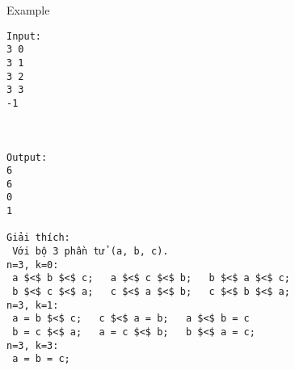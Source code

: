 Example
\begin{verbatim}
Input:
3 0
3 1
3 2
3 3
-1



Output:
6
6
0
1

Giải thích:
 Với bộ 3 phần tử (a, b, c). 
n=3, k=0:
 a $<$ b $<$ c;   a $<$ c $<$ b;   b $<$ a $<$ c; 
 b $<$ c $<$ a;   c $<$ a $<$ b;   c $<$ b $<$ a;
n=3, k=1:
 a = b $<$ c;   c $<$ a = b;   a $<$ b = c
 b = c $<$ a;   a = c $<$ b;   b $<$ a = c;
n=3, k=3:
 a = b = c; 

\end{verbatim}